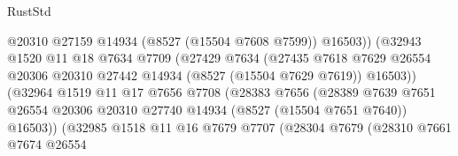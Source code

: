 \begin{lexlean}{RustStd}
\begin{coremodule}
                                        @20310
                                        @27159
                                        @14934
                                        (@8527 (@15504 @7608 @7599))
                                        @16503))
                                    (@32943
                                      @1520
                                      @11
                                      @18
                                      @7634
                                      @7709
                                      (@27429
                                        @7634
                                        (@27435
                                          @7618
                                          @7629
                                          @26554
                                          @20306
                                          @20310
                                          @27442
                                          @14934
                                          (@8527 (@15504 @7629 @7619))
                                          @16503))
                                      (@32964
                                        @1519
                                        @11
                                        @17
                                        @7656
                                        @7708
                                        (@28383
                                          @7656
                                          (@28389
                                            @7639
                                            @7651
                                            @26554
                                            @20306
                                            @20310
                                            @27740
                                            @14934
                                            (@8527 (@15504 @7651 @7640))
                                            @16503))
                                        (@32985
                                          @1518
                                          @11
                                          @16
                                          @7679
                                          @7707
                                          (@28304
                                            @7679
                                            (@28310
                                              @7661
                                              @7674
                                              @26554

\end{coremodule}
\end{lexlean}
